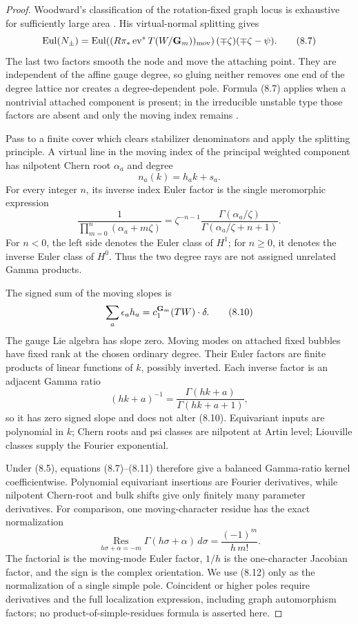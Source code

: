 \begin{proof}
Woodward's classification of the rotation-fixed graph locus is exhaustive
for sufficiently large area \cite[Corollary~9.10]{WoodwardQKIII}.  His
virtual-normal splitting gives
\[
 \operatorname{Eul}(N_\pm)=
 \operatorname{Eul}\!\left(
  (R\pi_*\operatorname{ev}^*T(W/\mathbf G_m))_{\mathrm{mov}}
 \right)(\mp\zeta)(\mp\zeta-\psi).                           \tag{8.7}
\]
The last two factors smooth the node and move the attaching point.  They are
independent of the affine gauge degree, so gluing neither removes one end of
the degree lattice nor creates a degree-dependent pole.  Formula (8.7)
applies when a nontrivial attached component is present; in the irreducible
unstable type those factors are absent and only the moving index remains
\cite[Example~9.15]{WoodwardQKIII}.

Pass to a finite cover which clears stabilizer denominators and apply the
splitting principle.  A virtual line in the moving index of the principal
weighted component has nilpotent Chern root \(\alpha_a\) and degree
\[
 n_a(k)=h_ak+s_a.                                             \tag{8.8}
\]
For every integer \(n\), its inverse index Euler factor is the single
meromorphic expression
\[
 \frac{1}{\prod_{m=0}^{n}(\alpha_a+m\zeta)}
 =\zeta^{-n-1}
   \frac{\Gamma(\alpha_a/\zeta)}
        {\Gamma(\alpha_a/\zeta+n+1)}.                         \tag{8.9}
\]
For \(n<0\), the left side denotes the Euler class of \(H^1\); for
\(n\geq0\), it denotes the inverse Euler class of \(H^0\).  Thus the two
degree rays are not assigned unrelated Gamma products.

The signed sum of the moving slopes is
\[
 \sum_a\epsilon_a h_a=c_1^{\mathbf G_m}(TW)\cdot\delta.              \tag{8.10}
\]
The gauge Lie algebra has slope zero.  Moving modes on attached fixed bubbles
have fixed rank at the chosen ordinary degree.  Their Euler factors are
finite products of linear functions of \(k\), possibly inverted.  Each
inverse factor is an adjacent Gamma ratio
\[
 (hk+a)^{-1}=\frac{\Gamma(hk+a)}{\Gamma(hk+a+1)},              \tag{8.11}
\]
so it has zero signed slope and does not alter (8.10).  Equivariant inputs
are polynomial in \(k\); Chern roots and psi classes are nilpotent at Artin
level; Liouville classes supply the Fourier exponential.

Under (8.5), equations (8.7)--(8.11) therefore give a balanced Gamma-ratio
kernel coefficientwise.  Polynomial equivariant insertions are Fourier
derivatives, while nilpotent Chern-root and bulk shifts give only finitely
many parameter derivatives.  For comparison, one moving-character residue
has the exact normalization
\[
 \operatorname*{Res}_{h\sigma+\alpha=-m}
 \Gamma(h\sigma+\alpha)\,d\sigma
 =\frac{(-1)^m}{h\,m!}.                                      \tag{8.12}
\]
The factorial is the moving-mode Euler factor, \(1/h\) is the
one-character Jacobian factor, and the sign is the complex orientation.  We
use (8.12) only as the normalization of a single simple pole.  Coincident or
higher poles require derivatives and the full localization expression,
including graph automorphism factors; no product-of-simple-residues formula
is asserted here.


\end{proof}
